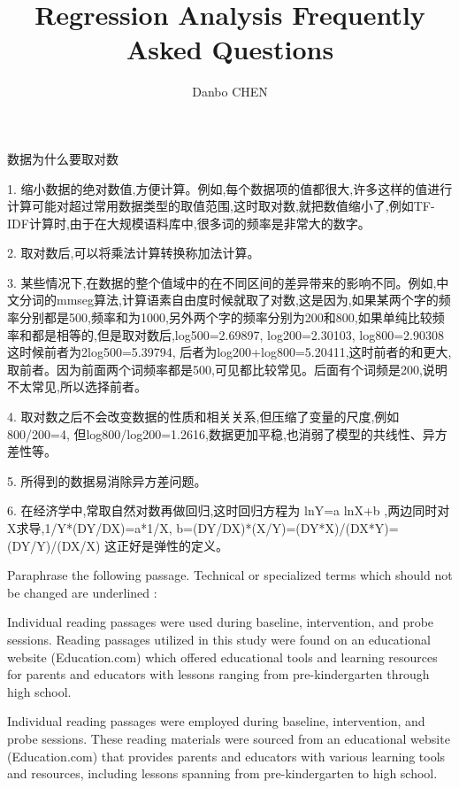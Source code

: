 \documentclass{homework}
\author{Danbo CHEN}
\title{Regression Analysis Frequently Asked Questions}
\begin{document}
 \maketitle


\question 数据为什么要取对数

\begin{sol}
1. 缩小数据的绝对数值,方便计算。例如,每个数据项的值都很大,许多这样的值进行计算可能对超过常用数据类型的取值范围,这时取对数,就把数值缩小了,例如TF-IDF计算时,由于在大规模语料库中,很多词的频率是非常大的数字。

2. 取对数后,可以将乘法计算转换称加法计算。

3. 某些情况下,在数据的整个值域中的在不同区间的差异带来的影响不同。例如,中文分词的mmseg算法,计算语素自由度时候就取了对数,这是因为,如果某两个字的频率分别都是500,频率和为1000,另外两个字的频率分别为200和800,如果单纯比较频率和都是相等的,但是取对数后,log500=2.69897, log200=2.30103, log800=2.90308 这时候前者为2log500=5.39794, 后者为log200+log800=5.20411,这时前者的和更大,取前者。因为前面两个词频率都是500,可见都比较常见。后面有个词频是200,说明不太常见,所以选择前者。

4. 取对数之后不会改变数据的性质和相关关系,但压缩了变量的尺度,例如800/200=4, 但log800/log200=1.2616,数据更加平稳,也消弱了模型的共线性、异方差性等。

5. 所得到的数据易消除异方差问题。

6. 在经济学中,常取自然对数再做回归,这时回归方程为 lnY=a lnX+b ,两边同时对X求导,1/Y*(DY/DX)=a*1/X, b=(DY/DX)*(X/Y)=(DY*X)/(DX*Y)=(DY/Y)/(DX/X) 这正好是弹性的定义。

\end{sol}

\question Paraphrase the following passage. Technical or specialized terms which should not  be changed are  underlined :

Individual reading passages were used during baseline, intervention, and probe sessions. Reading passages utilized in this study were found on an educational website (Education.com) which offered educational tools and learning resources for parents and educators with lessons ranging from pre-kindergarten through high school.

\begin{sol}

Individual reading passages were employed during baseline, intervention, and probe sessions. These reading materials were sourced from an educational website (Education.com) that provides parents and educators with various learning tools and resources, including lessons spanning from pre-kindergarten to high school.

\end{sol}
\end{document}
